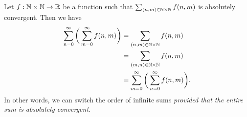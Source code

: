 \begin{thm}\label{i:8.2.2}
  Let \(f : \mathbb{N} \times \mathbb{N} \to \mathbb{R}\) be a function such that \(\sum_{(n, m) \in \mathbb{N} \times \mathbb{N}} f(n, m)\) is absolutely convergent.
  Then we have
  \begin{align*}
    \sum_{n = 0}^\infty \bigg(\sum_{m = 0}^\infty f(n, m)\bigg) & = \sum_{(n, m) \in \mathbb{N} \times \mathbb{N}} f(n, m)                       \\
                                                                & = \sum_{(m, n) \in \mathbb{N} \times \mathbb{N}} f(n, m)                       \\
                                                                & = \sum_{m = 0}^\infty \bigg(\sum_{n = 0}^\infty f(n, m)\bigg).
  \end{align*}
  In other words, we can switch the order of infinite sums \emph{provided that the entire sum is absolutely convergent}.
\end{thm}

